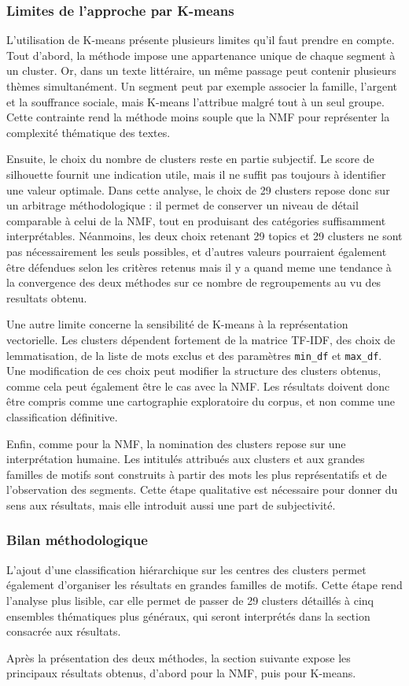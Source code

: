 \subsubsection{Limites de l'approche par K-means}

L'utilisation de K-means présente plusieurs limites qu'il faut prendre en compte. Tout d'abord, la méthode impose une appartenance unique de chaque segment à un cluster. Or, dans un texte littéraire, un même passage peut contenir plusieurs thèmes simultanément. Un segment peut par exemple associer la famille, l'argent et la souffrance sociale, mais K-means l'attribue malgré tout à un seul groupe. Cette contrainte rend la méthode moins souple que la NMF pour représenter la complexité thématique des textes.

Ensuite, le choix du nombre de clusters reste en partie subjectif. Le score de silhouette fournit une indication utile, mais il ne suffit pas toujours à identifier une valeur optimale. Dans cette analyse, le choix de 29 clusters repose donc sur un arbitrage méthodologique : il permet de conserver un niveau de détail comparable à celui de la NMF, tout en produisant des catégories suffisamment interprétables. Néanmoins, les deux choix retenant 29 topics et 29 clusters ne sont pas nécessairement les seuls possibles, et d'autres valeurs pourraient également être défendues selon les critères retenus mais il y a quand meme une tendance à la convergence des deux méthodes sur ce nombre de regroupements au vu des resultats obtenu.

Une autre limite concerne la sensibilité de K-means à la représentation vectorielle. Les clusters dépendent fortement de la matrice TF-IDF, des choix de lemmatisation, de la liste de mots exclus et des paramètres \texttt{min\_df} et \texttt{max\_df}. Une modification de ces choix peut modifier la structure des clusters obtenus, comme cela peut également être le cas avec la NMF. Les résultats doivent donc être compris comme une cartographie exploratoire du corpus, et non comme une classification définitive.

Enfin, comme pour la NMF, la nomination des clusters repose sur une interprétation humaine. Les intitulés attribués aux clusters et aux grandes familles de motifs sont construits à partir des mots les plus représentatifs et de l'observation des segments. Cette étape qualitative est nécessaire pour donner du sens aux résultats, mais elle introduit aussi une part de subjectivité.

\subsubsection{Bilan méthodologique}
L'ajout d'une classification hiérarchique sur les centres des clusters permet également d'organiser les résultats en grandes familles de motifs. Cette étape rend l'analyse plus lisible, car elle permet de passer de 29 clusters détaillés à cinq ensembles thématiques plus généraux, qui seront interprétés dans la section consacrée aux résultats.

Après la présentation des deux méthodes, la section suivante expose les principaux résultats obtenus, d'abord pour la NMF, puis pour K-means.